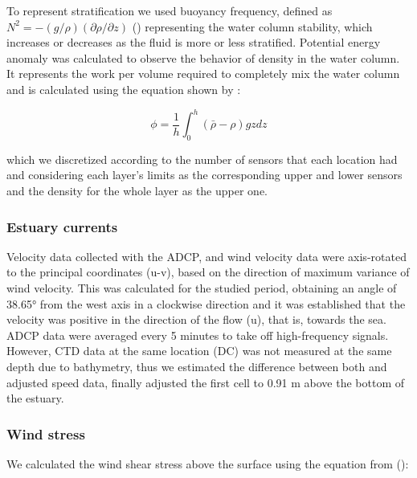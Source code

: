 \documentclass[11pt,letterpaper]{article}
\begin{document}
To represent stratification we used buoyancy frequency, defined as $N^2 = -(g/\rho)(\partial \rho/\partial z)$ (\cite{kundu2002fluid}) representing the water column stability, which increases or decreases as the fluid is more or less stratified. Potential energy anomaly was calculated to observe the behavior of density in the water column. It represents the work per volume required to completely mix the water column and is calculated using the equation shown by \citeauthor{simpson1990tidal}: 

\begin{equation}
    \phi=\frac{1}{h}\int^h_0(\bar{\rho}-\rho)gzdz
    \label{eq: phi}
\end{equation}

which we discretized according to the number of sensors that each location had and considering each layer's limits as the corresponding upper and lower sensors and the density for the whole layer as the upper one. 

\subsubsection{Estuary currents}

Velocity data collected with the ADCP, and wind velocity data were axis-rotated to the principal coordinates (u-v), based on the direction of maximum variance of wind velocity. This was calculated for the studied period, obtaining an angle of 38.65° from the west axis in a clockwise direction and it was established that the velocity was positive in the direction of the flow (u), that is, towards the sea.  \\


ADCP data were averaged every 5 minutes to take off high-frequency signals. However, CTD data at the same location (DC) was not measured at the same depth due to bathymetry, thus we estimated the difference between both and adjusted speed data, finally adjusted the first cell to 0.91 m above the bottom of the estuary. \\

\subsubsection{Wind stress}

We calculated the wind shear stress above the surface using the equation from \citeauthor{read2011derivation} (\cite*{read2011derivation}): 
\end{document}
